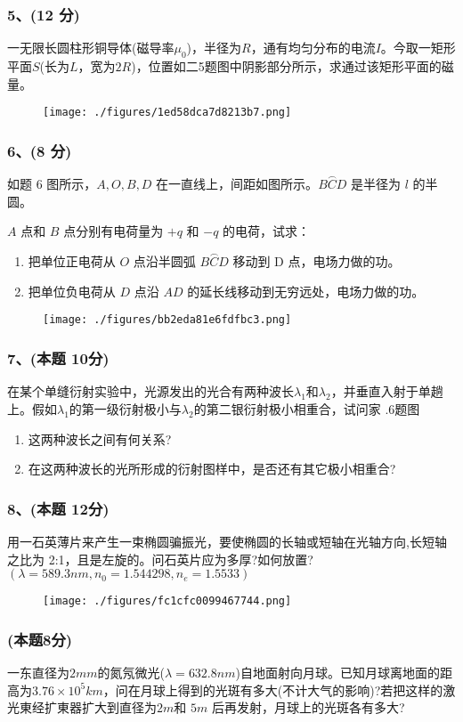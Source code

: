 \subsubsection{5、(12 分)}
一无限长圆柱形铜导体(磁导率$\mu_0$)，半径为$R$，通有均匀分布的电流$I$。今取一矩形平面$S$(长为$L$，宽为$2R$)，位置如二5题图中阴影部分所示，求通过该矩形平面的磁量。
\begin{figure}[ht]
\centering
\texttt{[image: ./figures/1ed58dca7d8213b7.png]}
\caption{} \label{fig_CD13_5}
\end{figure}
\subsubsection{6、(8 分)}
如题 6 图所示，$A,O,B,D$ 在一直线上，间距如图所示。$ \overset{\frown}{BCD} $ 是半径为 $l$ 的半圆。

$A$ 点和 $B$ 点分别有电荷量为 $+q$ 和 $-q$ 的电荷，试求：
\begin{enumerate}
\item 把单位正电荷从 $O$ 点沿半圆弧 $\overset{\frown}{BCD}$ 移动到 D 点，电场力做的功。
\item 把单位负电荷从 $D$ 点沿 $AD$ 的延长线移动到无穷远处，电场力做的功。
\end{enumerate}
\begin{figure}[ht]
\centering
\texttt{[image: ./figures/bb2eda81e6fdfbc3.png]}
\caption{} \label{fig_CD13_6}
\end{figure}
\subsubsection{7、(本题 10分)}
在某个单缝衍射实验中，光源发出的光合有两种波长$\lambda_1$和$\lambda_2$，并垂直入射于单趟上。假如$\lambda_1$的第一级衍射极小与$\lambda_2$的第二银衍射极小相重合，试问家
.6题图
\begin{enumerate}
\item 这两种波长之间有何关系?
\item 在这两种波长的光所形成的衍射图样中，是否还有其它极小相重合?
\end{enumerate}
\subsubsection{8、(本题 12分)}
用一石英薄片来产生一束椭圆骗振光，要使椭圆的长轴或短轴在光轴方向,长短轴之比为 2:1，且是左旋的。问石英片应为多厚?如何放置?$(\lambda=589.3nm,n_0=1.544298,n_e=1.5533)$
\begin{figure}[ht]
\centering
\texttt{[image: ./figures/fc1cfc0099467744.png]}
\caption{} \label{fig_CD13_7}
\end{figure}
\subsubsection{(本题8分)}
一东直径为$2mm$的氮氖微光($\lambda=632.8nm$)自地面射向月球。已知月球离地面的距高为$3.76\times10^5km$，问在月球上得到的光斑有多大(不计大气的影响)?若把这样的激光東经扩東器扩大到直径为$2m$和 $5m$ 后再发射，月球上的光斑各有多大?
